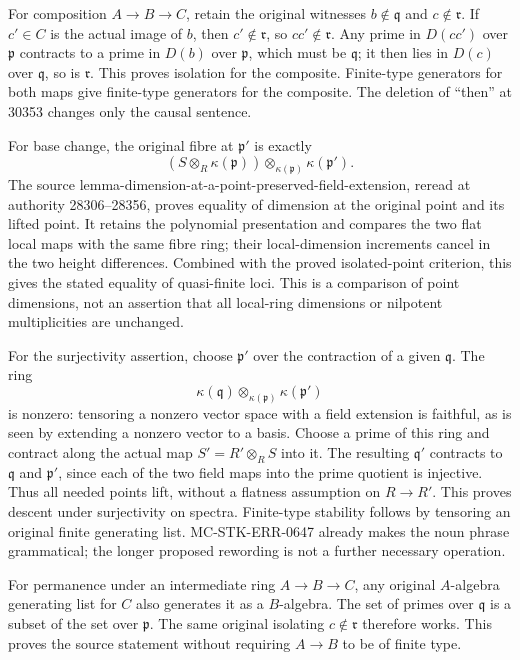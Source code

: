 For composition \(A\to B\to C\), retain the original witnesses \(b\notin\mathfrak q\) and \(c\notin\mathfrak r\). If \(c'\in C\) is the actual image of \(b\), then \(c'\notin\mathfrak r\), so \(cc'\notin\mathfrak r\). Any prime in \(D(cc')\) over \(\mathfrak p\) contracts to a prime in \(D(b)\) over \(\mathfrak p\), which must be \(\mathfrak q\); it then lies in \(D(c)\) over \(\mathfrak q\), so is \(\mathfrak r\). This proves isolation for the composite. Finite-type generators for both maps give finite-type generators for the composite. The deletion of ``then'' at 30353 changes only the causal sentence.

For base change, the original fibre at \(\mathfrak p'\) is exactly \[
 (S\otimes_R\kappa(\mathfrak p))
       \otimes_{\kappa(\mathfrak p)}\kappa(\mathfrak p').
\] The source lemma-dimension-at-a-point-preserved-field-extension, reread at authority 28306--28356, proves equality of dimension at the original point and its lifted point. It retains the polynomial presentation and compares the two flat local maps with the same fibre ring; their local-dimension increments cancel in the two height differences. Combined with the proved isolated-point criterion, this gives the stated equality of quasi-finite loci. This is a comparison of point dimensions, not an assertion that all local-ring dimensions or nilpotent multiplicities are unchanged.

For the surjectivity assertion, choose \(\mathfrak p'\) over the contraction of a given \(\mathfrak q\). The ring \[
 \kappa(\mathfrak q)\otimes_{\kappa(\mathfrak p)}
       \kappa(\mathfrak p')
\] is nonzero: tensoring a nonzero vector space with a field extension is faithful, as is seen by extending a nonzero vector to a basis. Choose a prime of this ring and contract along the actual map \(S'=R'\otimes_RS\) into it. The resulting \(\mathfrak q'\) contracts to \(\mathfrak q\) and \(\mathfrak p'\), since each of the two field maps into the prime quotient is injective. Thus all needed points lift, without a flatness assumption on \(R\to R'\). This proves descent under surjectivity on spectra. Finite-type stability follows by tensoring an original finite generating list. MC-STK-ERR-0647 already makes the noun phrase grammatical; the longer proposed rewording is not a further necessary operation.

For permanence under an intermediate ring \(A\to B\to C\), any original \(A\)-algebra generating list for \(C\) also generates it as a \(B\)-algebra. The set of primes over \(\mathfrak q\) is a subset of the set over \(\mathfrak p\). The same original isolating \(c\notin\mathfrak r\) therefore works. This proves the source statement without requiring \(A\to B\) to be of finite type.

